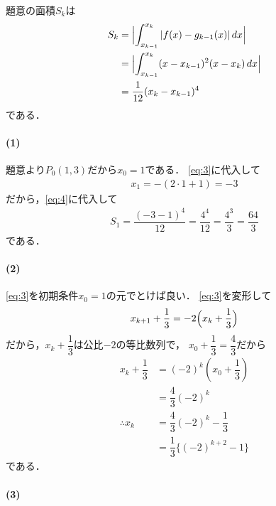 \documentclass[../../main.tex]{subfiles}
\begin{document}
題意の面積$S_k$は
\begin{align}
  S_k
  &=\Bigl|\int_{x_{k-1}}^{x_k}\left| f(x)-g_{k-1}(x)\right| dx\Bigr| \\
  &=\Bigl|\int_{x_{k-1}}^{x_k}(x-x_{k-1})^2(x-x_k)\,dx\Bigr| \\
  &=\dfrac{1}{12}(x_k-x_{k-1})^4 \label{eq:4}
\end{align}
である．

\paragraph{(1)}

題意より$P_0(1,3)$だから$x_0=1$である．
\cref{eq:3}に代入して
\begin{align}
  x_1=-(2\cdot1+1)=-3
\end{align}
だから，\cref{eq:4}に代入して
\begin{align}
  S_1=\dfrac{(-3-1)^4}{12}=\dfrac{4^4}{12}=\dfrac{4^3}{3}=\dfrac{64}{3} \label{eq:5}
\end{align}
である．

\paragraph{(2)}

\cref{eq:3}を初期条件$x_0=1$の元でとけば良い．
\cref{eq:3}を変形して
\begin{align}
  x_{k+1}+\dfrac{1}{3}=-2\Bigl(x_k+\dfrac{1}{3}\Bigr)
\end{align}
だから，$x_k+\dfrac{1}{3}$は公比$-2$の等比数列で，
$x_0+\dfrac{1}{3}=\dfrac{4}{3}$だから
\begin{align}
  x_k+\dfrac{1}{3}
  &= (-2)^{k} \left(x_0 + \dfrac{1}{3}\right) \\
  &=\dfrac{4}{3}(-2)^k \\
  \therefore
  x_k&=\dfrac{4}{3}(-2)^k-\dfrac{1}{3} \\
  &=\dfrac{1}{3}\bigl\{(-2)^{k+2}-1\bigr\} \label{eq:6}
\end{align}
である．

\paragraph{(3)}
\end{document}
